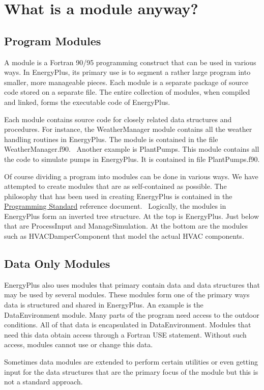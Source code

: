 \section{What is a module anyway?}\label{what-is-a-module-anyway}

\subsection{Program Modules}\label{program-modules}

A module is a Fortran 90/95 programming construct that can be used in various ways. In EnergyPlus, its primary use is to segment a rather large program into smaller, more manageable pieces. Each module is a separate package of source code stored on a separate file. The entire collection of modules, when compiled and linked, forms the executable code of EnergyPlus.

Each module contains source code for closely related data structures and procedures. For instance, the WeatherManager module contains all the weather handling routines in EnergyPlus. The module is contained in the file WeatherManager.f90.~ Another example is PlantPumps. This module contains all the code to simulate pumps in EnergyPlus. It is contained in file PlantPumps.f90.

Of course dividing a program into modules can be done in various ways. We have attempted to create modules that are as self-contained as possible. The philosophy that has been used in creating EnergyPlus is contained in the \href{ProgrammingStandards.pdf}{Programming Standard} reference document.~ Logically, the modules in EnergyPlus form an inverted tree structure. At the top is EnergyPlus. Just below that are ProcessInput and ManageSimulation. At the bottom are the modules such as HVACDamperComponent that model the actual HVAC components.

\subsection{Data Only Modules}\label{data-only-modules}

EnergyPlus also uses modules that primary contain data and data structures that may be used by several modules. These modules form one of the primary ways data is structured and shared in EnergyPlus. An example is the DataEnvironment module. Many parts of the program need access to the outdoor conditions. All of that data is encapsulated in DataEnvironment. Modules that need this data obtain access through a Fortran USE statement. Without such access, modules cannot use or change this data.

Sometimes data modules are extended to perform certain utilities or even getting input for the data structures that are the primary focus of the module but this is not a standard approach.
